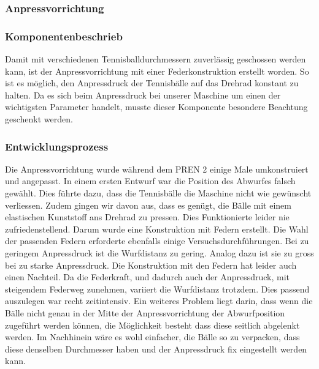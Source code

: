 \subsubsection{Anpressvorrichtung}
\subsubsection*{Komponentenbeschrieb}
Damit mit verschiedenen Tennisballdurchmessern zuverlässig geschossen werden kann, ist der Anpressvorrichtung mit einer Federkonstruktion erstellt worden. So ist es möglich, den Anpressdruck der Tennisbälle auf das Drehrad konstant zu halten. Da es sich beim Anpressdruck bei unserer Maschine um einen der wichtigsten Parameter handelt, musste dieser Komponente besondere Beachtung geschenkt werden. 

\subsubsection*{Entwicklungsprozess}
Die Anpressvorrichtung wurde während dem PREN 2 einige Male umkonstruiert und angepasst. In einem ersten Entwurf war die Position des Abwurfes falsch gewählt. Dies führte dazu, dass die Tennisbälle die Maschine nicht wie gewünscht verliessen. Zudem gingen wir davon aus, dass es genügt, die Bälle mit einem elastischen Kunststoff ans Drehrad zu pressen. Dies Funktionierte leider nie zufriedenstellend. Darum wurde eine Konstruktion mit Federn erstellt. Die Wahl der passenden Federn erforderte ebenfalls einige Versuchsdurchführungen. Bei zu geringem Anpressdruck ist die Wurfdistanz zu gering. Analog dazu ist sie zu gross bei zu starke Anpressdruck. Die Konstruktion mit den Federn hat leider auch einen Nachteil. Da die Federkraft, und dadurch auch der Anpressdruck, mit steigendem Federweg zunehmen, variiert die Wurfdistanz trotzdem. Dies passend auszulegen war recht zeitintensiv. Ein weiteres Problem liegt darin, dass wenn die Bälle nicht genau in der Mitte der Anpressvorrichtung der Abwurfposition zugeführt werden können, die Möglichkeit besteht dass diese seitlich abgelenkt werden. Im Nachhinein wäre es wohl einfacher, die Bälle so zu verpacken, dass diese denselben Durchmesser haben und der Anpressdruck fix eingestellt werden kann.